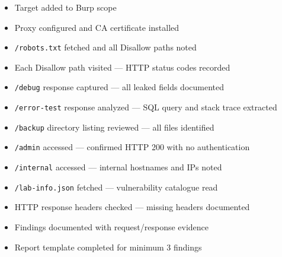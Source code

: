 \begin{tcolorbox}[findingstyle, title={Level 01 Burp Checklist}]
\begin{itemize}
  \item[\checkbox] Target added to Burp scope
  \item[\checkbox] Proxy configured and CA certificate installed
  \item[\checkbox] \texttt{/robots.txt} fetched and all Disallow paths noted
  \item[\checkbox] Each Disallow path visited — HTTP status codes recorded
  \item[\checkbox] \texttt{/debug} response captured — all leaked fields documented
  \item[\checkbox] \texttt{/error-test} response analyzed — SQL query and stack trace extracted
  \item[\checkbox] \texttt{/backup} directory listing reviewed — all files identified
  \item[\checkbox] \texttt{/admin} accessed — confirmed HTTP 200 with no authentication
  \item[\checkbox] \texttt{/internal} accessed — internal hostnames and IPs noted
  \item[\checkbox] \texttt{/lab-info.json} fetched — vulnerability catalogue read
  \item[\checkbox] HTTP response headers checked — missing headers documented
  \item[\checkbox] Findings documented with request/response evidence
  \item[\checkbox] Report template completed for minimum 3 findings
\end{itemize}
\end{tcolorbox}
